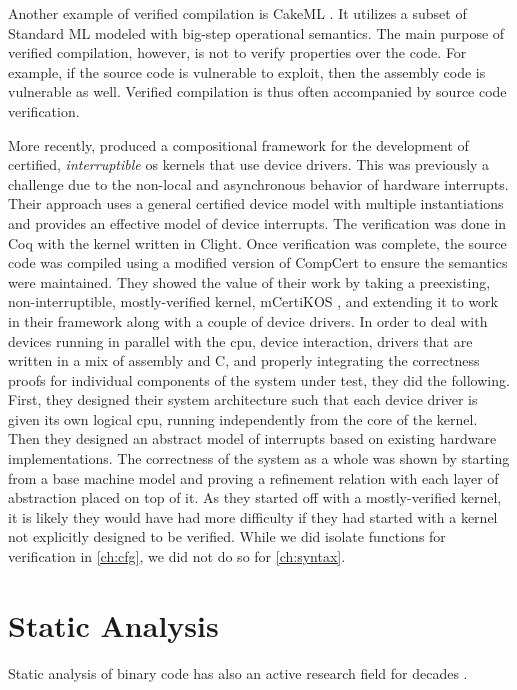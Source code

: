 Another example of verified compilation is CakeML \autocite{kumar2014cakeml}.
It utilizes a subset of Standard ML modeled with big-step operational semantics.
The main purpose of verified compilation, however,
is not to verify properties over the code.
For example, if the source code is vulnerable to  exploit,
then the assembly code is vulnerable as well.
Verified compilation is thus often accompanied by source code verification.

More recently, \textcite{chen2018compositional} produced a compositional framework
for the development of certified, \emph{interruptible}%
\ac{os} kernels that use device drivers.%
This was previously a challenge due to the non-local and asynchronous behavior
of hardware interrupts. Their approach uses a general certified device model
with multiple instantiations and provides an effective model of device interrupts.
The verification was done in Coq with the kernel written in Clight.
Once verification was complete, the source code was compiled using a modified version
of CompCert to ensure the semantics were maintained.
They showed the value of their work by taking a preexisting,
non-interruptible, mostly-verified kernel, mCertiKOS \autocite{costanzo2016endtoend},
and extending it to work in their framework along with a couple of device drivers.
In order to deal with devices running in parallel with the \ac{cpu},
device interaction, drivers that are written in a mix of assembly and C,
and properly integrating the correctness proofs for individual components
of the system under test, they did the following.
First, they designed their system architecture such that each device driver
is given its own logical \ac{cpu}, running independently from the core of the kernel.
Then they designed an abstract model of interrupts
based on existing hardware implementations.
The correctness of the system as a whole was shown
by starting from a base machine model
and proving a refinement relation with each layer of abstraction placed on top of it.
As they started off with a mostly-verified kernel, it is likely they would have had
more difficulty if they had started with a kernel
not explicitly designed to be verified. While we did isolate functions
for verification in \cref{ch:cfg}, we did not do so for \cref{ch:syntax}.

\section{Static Analysis}\label{se:static_analysis}
Static analysis of binary code has also an active research field
for decades  \autocite{kruegel2005automating,brumley2011bap,wang2017angr}.

